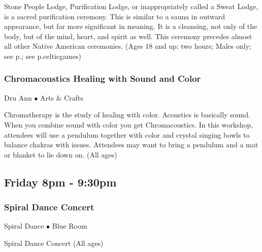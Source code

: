  Stone People Lodge, Purification Lodge, or inappropriately called a Sweat Lodge, is a sacred purification ceremony. This is similar to a sauna in outward appearance, but far more significant in meaning. It is a cleansing, not only of the body, but of the mind, heart, and spirit as well. This ceremony precedes almost all other Native American ceremonies. {\small (Ages 18 and up; two hours; Males only; see p.\pageref{sweatlodge}; see p.{celticgames})}

\subsubsection{Chromacoustics Healing with Sound and Color}
\label{Fri-DruAnn2}
{\small Dru Ann $\bullet$  Arts \& Crafts}

 Chromatherapy is the study of healing with color. Acoustics is basically sound. When you combine sound with color you get Chromacoustics. In this workshop, attendees will use a pendulum together with color and crystal singing bowls to balance chakras with issues. Attendees may want to bring a pendulum and a mat or blanket to lie down on. {\small (All ages)}

\subsection{Friday 8pm - 9:30pm}

\subsubsection{Spiral Dance Concert}
\label{Fri-Concert1}
{\small Spiral Dance $\bullet$  Blue Room}

 Spiral Dance Concert {\small (All ages)}